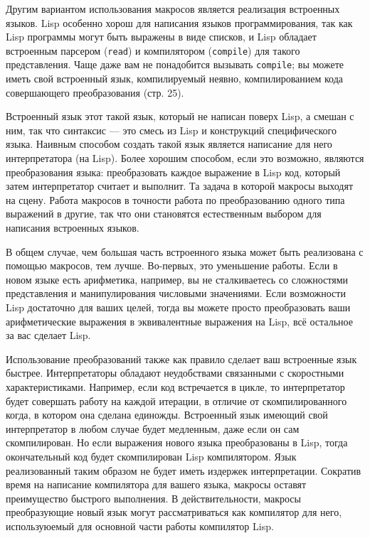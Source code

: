 \documentclass[12pt, a4paper]{article} %
\begin{document}
Другим вариантом использования макросов является реализация встроенных языков. Lisp особенно хорош для написания языков программирования, так как Lisp программы могут быть выражены в виде списков, и Lisp обладает встроенным парсером (\texttt{read}) и компилятором (\texttt{compile}) для такого представления. Чаще даже вам не понадобится вызывать \texttt{compile}; вы можете иметь свой встроенный язык, компилируемый неявно, компилированием кода совершающего преобразования (стр. 25).

Встроенный язык этот такой язык, который не написан поверх Lisp, а смешан с ним, так что синтаксис --- это смесь из Lisp и конструкций специфического языка. Наивным способом создать такой язык является написание для него интерпретатора (на Lisp). Более хорошим способом, если это возможно, являются преобразования языка: преобразовать каждое выражение в Lisp код, который затем интерпретатор считает и выполнит. Та задача в которой макросы выходят на сцену. Работа макросов в точности работа по преобразованию одного типа выражений в другие, так что они становятся естественным выбором для написания встроенных языков. 

В общем случае, чем большая часть встроенного языка может быть реализована с помощью макросов, тем лучше. Во-первых, это уменьшение работы. Если в новом языке есть арифметика, например, вы не сталкиваетесь со сложностями представления и манипулирования числовыми значениями. Если возможности Lisp достаточно для ваших целей, тогда вы можете просто преобразовать ваши арифметические выражения в эквивалентные выражения на Lisp, всё остальное за вас сделает Lisp.

Использование преобразований также как правило сделает ваш встроенные язык быстрее. Интерпретаторы обладают неудобствами связанными с скоростными характеристиками. Например, если код встречается в цикле, то интерпретатор будет совершать работу на каждой итерации, в отличие от скомпилированного когда, в котором она сделана единожды. Встроенный язык имеющий свой интерпретатор в любом случае будет медленным, даже если он сам скомпилирован. Но если выражения нового языка преобразованы в Lisp, тогда окончательный код будет скомпилирован Lisp компилятором. Язык реализованный таким образом не будет иметь издержек интерпретации. Сократив время на написание компилятора для вашего языка, макросы оставят преимущество быстрого выполнения. В действительности, макросы преобразующие новый язык могут рассматриваться как компилятор для него, используюемый для основной части работы компилятор Lisp.
\end{document}
